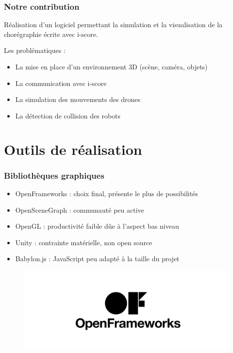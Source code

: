 \documentclass[10pt]{beamer}
\begin{document}
\begin{frame}
	\frametitle{Notre contribution}
    Réalisation d'un logiciel permettant la simulation et la visualisation de la chorégraphie écrite avec i-score.
    
 	Les problématiques : 
    \begin{itemize} 
    	\item La mise en place d'un environnement 3D (scène, caméra, objets)
        \item La communication avec i-score
        \item La simulation des mouvements des drones
        \item La détection de collision des robots
	\end{itemize}
 

\end{frame}


\section{Outils de réalisation}

\begin{frame}
	\frametitle{Bibliothèques graphiques}
    \begin{itemize}
		\item OpenFrameworks : choix final, présente le plus de possibilités
        \item OpenSceneGraph : communauté peu active 
        \item OpenGL : productivité faible dûe à l'aspect bas niveau
        \item Unity : contrainte matérielle, non open source
        \item Babylon.js : JavaScript peu adapté à la taille du projet 
	\end{itemize}
    	\begin{figure}
     \includegraphics[scale=0.15]{oflogo}
    \end{figure}
\end{frame}
\end{document}
